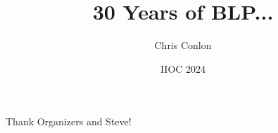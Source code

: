 

\usepackage{lipsum}
\usepackage{amsmath} 
\usepackage{amsthm} 
\usepackage{amssymb} 
\usepackage{mathtools}
\usepackage{dutchcal}
\usepackage{stackengine}


\newcommand{\vect}[1]{\boldsymbol{\mathbf{#1}}}
\newcommand{\pd}[2]{\frac{\partial{#1}}{\partial{#2}}}
\newcommand{\expect}[2]{\mathbb{E}_{#1}\left[{#2}\right]}
\newcommand{\expectsmall}[2]{\mathbb{E}_{#1}{#2}}
\newcommand{\expectsuper}[3]{\mathbb{E}_{#1}^{#2}\left[{#3}\right]}
\newcommand{\ind}[1]{\mathbbm{1}\left\{{#1}\right\}}
\newcommand{\prob}[1]{\mathbb{P}\left\{{#1}\right\}}
\newcommand{\derivative}[2]{\frac{d{#2}}{d{#1}}}
\newcommand{\cat}[1]{\citeasnoun{#1}}

\stackMath
\newlength\matfield
\newlength\tmplength
\def\matscale{1.}
\newcommand\dimbox[3]{%
  \setlength\matfield{\matscale\baselineskip}%
  \setbox0=\hbox{\vphantom{X}\smash{#3}}%
  \setlength{\tmplength}{#1\matfield-\ht0-\dp0}%
  \fboxrule=1pt\fboxsep=-\fboxrule\relax%
  \fbox{\makebox[#2\matfield]{\addstackgap[.5\tmplength]{\box0}}}%
}
\newcommand\raiserows[2]{%
   \setlength\matfield{\matscale\baselineskip}%
   \raisebox{#1\matfield}{#2}%
}
\newcommand\matbox[5]{
  \stackunder{\dimbox{#1}{#2}{$\mathbf{#5}$}}{\scriptstyle(#3\times #4)}%
}



\title{30 Years of BLP...}
\author{Chris Conlon}

\date{IIOC 2024}








\begin{frame}[plain] %
\titlepage
\end{frame}



\begin{frame}{}
Thank Organizers and Steve!
\end{frame}


